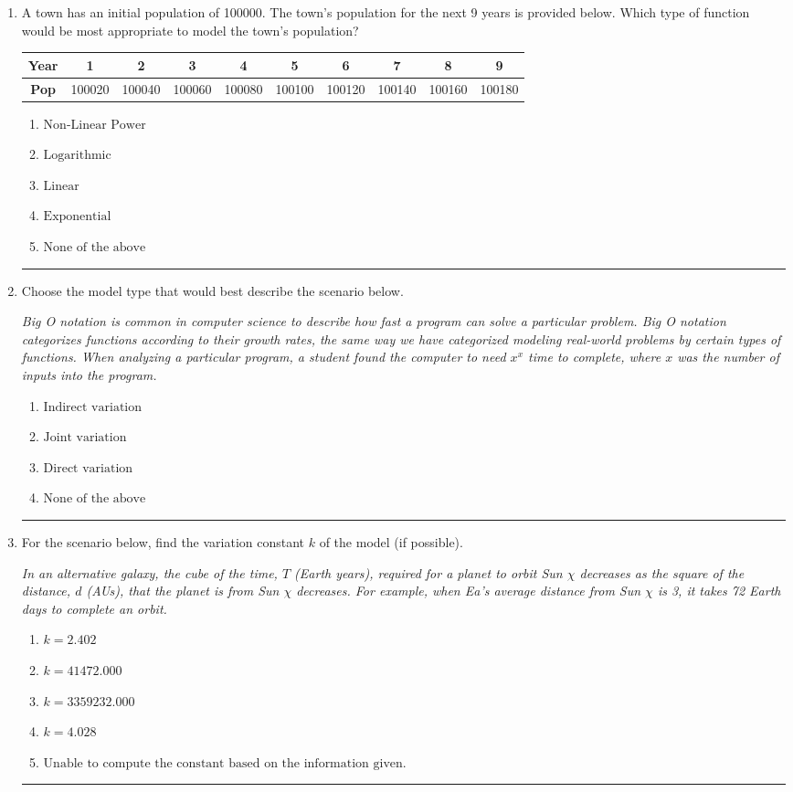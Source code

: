\documentclass[14pt]{extbook}
\newcommand{\litem}[1]{\item#1\hspace*{-1cm}\rule{\textwidth}{0.4pt}}
\begin{document}
\begin{enumerate}
{\begin{enumerate}[label=\Alph*.]
\end{enumerate} }
\litem{
A town has an initial population of 100000. The town's population for the next 9 years is provided below. Which type of function would be most appropriate to model the town's population?

\begin{tabular}{c|c|c|c|c|c|c|c|c|c}
\textbf{Year} &1 &2 &3 &4 &5 &6 &7 &8 &9\tabularnewline \hline
\textbf{Pop} &100020 &100040 &100060 &100080 &100100 &100120 &100140 &100160 &100180\end{tabular}\begin{enumerate}[label=\Alph*.]
\item \( \text{Non-Linear Power} \)
\item \( \text{Logarithmic} \)
\item \( \text{Linear} \)
\item \( \text{Exponential} \)
\item \( \text{None of the above} \)

\end{enumerate} }
\litem{
Choose the model type that would best describe the scenario below.
\begin{center}
    \textit{ Big O notation is common in computer science to describe how fast a program can solve a particular problem. Big O notation categorizes functions according to their growth rates, the same way we have categorized modeling real-world problems by certain types of functions. When analyzing a particular program, a student found the computer to need $x^x$ time to complete, where $x$ was the number of inputs into the program. }
\end{center}
\begin{enumerate}[label=\Alph*.]
\item \( \text{Indirect variation} \)
\item \( \text{Joint variation} \)
\item \( \text{Direct variation} \)
\item \( \text{None of the above} \)

\end{enumerate} }
\litem{
For the scenario below, find the variation constant $k$ of the model (if possible).
\begin{center}
    \textit{ In an alternative galaxy, the cube of the time, $T$ (Earth years), required for a planet to orbit Sun $\chi$ decreases as the square of the distance, $d$ (AUs), that the planet is from Sun $\chi$ decreases. For example, when Ea's average distance from Sun $\chi$ is 3, it takes 72 Earth days to complete an orbit. }
\end{center}
\begin{enumerate}[label=\Alph*.]
\item \( k = 2.402 \)
\item \( k = 41472.000 \)
\item \( k = 3359232.000 \)
\item \( k = 4.028 \)
\item \( \text{Unable to compute the constant based on the information given.} \)


\end{enumerate}}
\end{enumerate}
\end{document}
